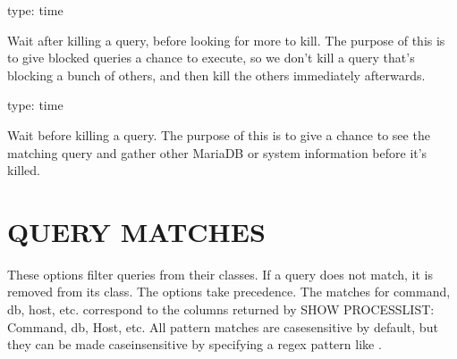 \documentclass[letterpaper,10pt,english]{sphinxmanual}
\begin{document}
\begin{fulllineitems}
\label{\detokenize{mariadb-kill:cmdoption-mariadb-kill-wait-after-kill}}
\sphinxAtStartPar
type: time

\sphinxAtStartPar
Wait after killing a query, before looking for more to kill.  The purpose of
this is to give blocked queries a chance to execute, so we don’t kill a query
that’s blocking a bunch of others, and then kill the others immediately
afterwards.

\end{fulllineitems}


\begin{fulllineitems}
\label{\detokenize{mariadb-kill:cmdoption-mariadb-kill-wait-before-kill}}
\sphinxAtStartPar
type: time

\sphinxAtStartPar
Wait before killing a query.  The purpose of this is to give
{\hyperref[\detokenize{mariadb-kill:cmdoption-mariadb-kill-execute-command}]{}} a chance to see the matching query and gather other
MariaDB or system information before it’s killed.

\end{fulllineitems}



\section{QUERY MATCHES}
\label{\detokenize{mariadb-kill:query-matches}}
\sphinxAtStartPar
These options filter queries from their classes.  If a query does not
match, it is removed from its class.  The  options take precedence.
The matches for command, db, host, etc. correspond to the columns returned
by SHOW PROCESSLIST: Command, db, Host, etc.  All pattern matches are
case\sphinxhyphen{}sensitive by default, but they can be made case\sphinxhyphen{}insensitive by specifying
a regex pattern like .
\end{document}
